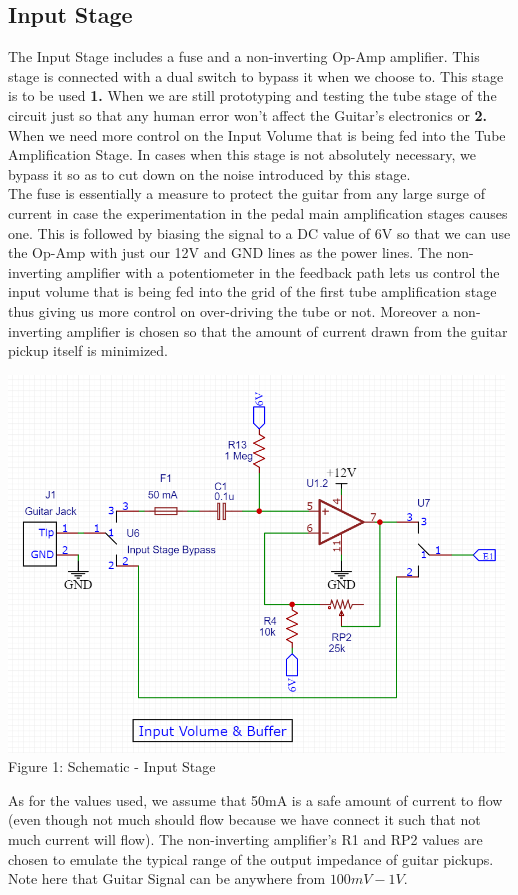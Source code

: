 \documentclass[11pt]{article}
\newcommand{\tab}{\hspace*{6mm}}
\begin{document}
\subsection{Input Stage}
\tab The Input Stage includes a fuse and a non-inverting Op-Amp amplifier. This stage is connected with a dual switch to bypass it when we choose to. This stage is to be used \textbf{1.} When we are still prototyping and testing the tube stage of the circuit just so that any human error won't affect the Guitar's electronics or \textbf{2.} When we need more control on the Input Volume that is being fed into the Tube Amplification Stage. In cases when this stage is not absolutely necessary, we bypass it so as to cut down on the noise introduced by this stage.\\

\tab The fuse is essentially a measure to protect the guitar from any large surge of current in case the experimentation in the pedal main amplification stages causes one. This is followed by biasing the signal to a DC value of 6V so that we can use the Op-Amp with just our 12V and GND lines as the power lines. The non-inverting amplifier with a potentiometer in the feedback path lets us control the input volume that is being fed into the grid of the first tube amplification stage thus giving us more control on over-driving the tube or not. Moreover a non-inverting amplifier is chosen so that the amount of current drawn from the guitar pickup itself is minimized.
\begin{center}\includegraphics[height=10cm]{sch_input.png}\\\small{Figure 1: Schematic - Input Stage}\end{center}
\tab As for the values used, we assume that 50mA is a safe amount of current to flow (even though not much should flow because we have connect it such that not much current will flow). The non-inverting amplifier's R1 and RP2 values are chosen to emulate the typical range of the output impedance of guitar pickups. Note here that Guitar Signal can be anywhere from $100mV - 1V$.
\newpage
\end{document}
